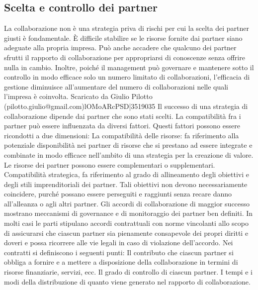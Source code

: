 \documentclass{article}
\begin{document}
\subsection{Scelta e controllo dei partner}
La collaborazione non è una strategia priva di rischi per cui la scelta dei partner giusti è
fondamentale. È difficile stabilire se le risorse fornite dai partner siano adeguate alla propria
impresa. Può anche accadere che qualcuno dei partner sfrutti il rapporto di collaborazione per
appropriarsi di conoscenze senza offrire nulla in cambio. Inoltre, poiché il management può
governare e mantenere sotto il controllo in modo efficace solo un numero limitato di
collaborazioni, l’efficacia di gestione diminuisce all’aumentare del numero di collaborazioni nelle
quali l’impresa è coinvolta.
Scaricato da Giulio Pilotto (pilotto.giulio@gmail.com)lOMoARcPSD|3519035
Il successo di una strategia di collaborazione dipende dai partner che sono stati scelti.
La compatibilità fra i partner può essere influenzata da diversi fattori. Questi fattori possono
essere ricondotti a due dimensioni:
La compatibilità delle risorse: fa riferimento alla potenziale disponibilità nei partner di
risorse che si prestano ad essere integrate e combinate in modo efficace nell’ambito di una
strategia per la creazione di valore. Le risorse dei partner possono essere complementari o
supplementari.
Compatibilità strategica, fa riferimento al grado di allineamento degli obiettivi e degli stili
imprenditoriali dei partner. Tali obiettivi non devono necessariamente coincidere, purché
possano essere perseguiti e raggiunti senza recare danno all’alleanza o agli altri partner.
Gli accordi di collaborazione di maggior successo mostrano meccanismi di governance e di
monitoraggio dei partner ben definiti. In molti casi le parti stipulano accordi contrattuali con
norme vincolanti allo scopo di assicurarsi che ciascun partner sia pienamente consapevole dei
propri diritti e doveri e possa ricorrere alle vie legali in caso di violazione dell’accordo. Nei contratti
si definiscono i seguenti punti:
Il contributo che ciascun partner si obbliga a fornire e a mettere a disposizione della
collaborazione in termini di risorse finanziarie, servizi, ecc.
Il grado di controllo di ciascun partner.
I tempi e i modi della distribuzione di quanto viene generato nel rapporto di collaborazione.
\end{document}
